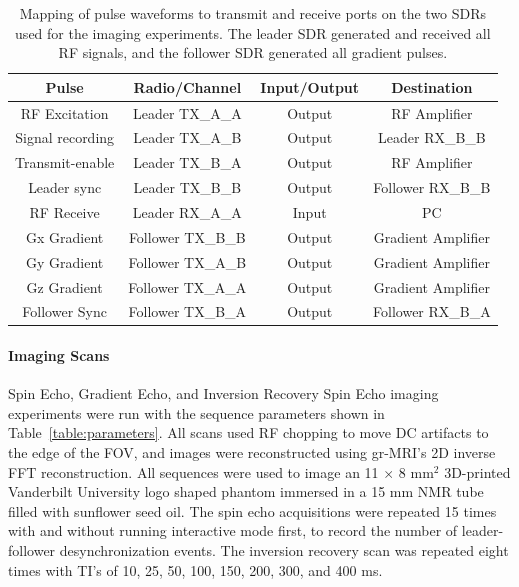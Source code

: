 \documentclass[10pt,letterpaper]{article}
\begin{document}
\begin{table}
\begin{tabular}[c]{| c | c | c | c |}
	\hline
	\textbf{Pulse} & \textbf{Radio/Channel} & \textbf{Input/Output} & \textbf{Destination} \\ \hline
	RF Excitation & Leader TX\_A\_A & Output & RF Amplifier\\ \hline
	Signal recording & Leader TX\_A\_B & Output & Leader RX\_B\_B\\ \hline
	Transmit-enable & Leader TX\_B\_A & Output & RF Amplifier\\ \hline
	Leader sync & Leader TX\_B\_B & Output & Follower RX\_B\_B\\ \hline
	RF Receive & Leader RX\_A\_A & Input & PC \\ \hline
	Gx Gradient & Follower TX\_B\_B & Output & Gradient Amplifier\\ \hline
	Gy Gradient & Follower TX\_A\_B & Output & Gradient Amplifier\\ \hline
	Gz Gradient & Follower TX\_A\_A & Output & Gradient Amplifier\\ \hline
	Follower Sync & Follower TX\_B\_A & Output & Follower RX\_B\_A\\ \hline
\end{tabular}
\caption{Mapping of pulse waveforms to transmit and receive ports on the two SDRs used for the imaging experiments.
The leader SDR generated and received all RF signals,
and the follower SDR generated all gradient pulses.}
\label{table:hardware}
\end{table}

\paragraph{Imaging Scans}
Spin Echo, Gradient Echo, and Inversion Recovery Spin Echo imaging experiments were run with
the sequence parameters shown in Table~\ref{table:parameters}.
All scans used RF chopping to move DC artifacts to the edge of the FOV, 
and images were reconstructed using gr-MRI's 2D inverse FFT reconstruction. 
All sequences were used to image an 11 $\times$ 8 mm$^2$ 3D-printed Vanderbilt University logo shaped phantom
immersed in a 15 mm NMR tube filled with sunflower seed oil.
The spin echo acquisitions were repeated 15 times with and without running interactive mode first,
to record the number of leader-follower desynchronization events.
The inversion recovery scan was repeated eight times with TI's of
10, 25, 50, 100, 150, 200, 300, and 400 ms. 
\end{document}
